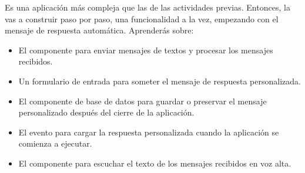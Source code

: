 {Es una aplicación más compleja que las de las actividades previas.
Entonces, la vas a construir paso por paso, una funcionalidad a la
vez, empezando con el mensaje de respuesta automática. Aprenderás
sobre:

\begin{itemize}

\item El componente  para enviar mensajes de
  textos y procesar los mensajes recibidos.

\item Un formulario de entrada para someter el mensaje de respuesta
  personalizada.

\item El componente de base de datos  para guardar o
  preservar el mensaje personalizado después del cierre de la
  aplicación.

\item El evento  para cargar la respuesta
  personalizada cuando la aplicación se comienza a ejecutar.

\item El componente  para escuchar el texto de
  los mensajes recibidos en voz alta.

\end{itemize}





}
